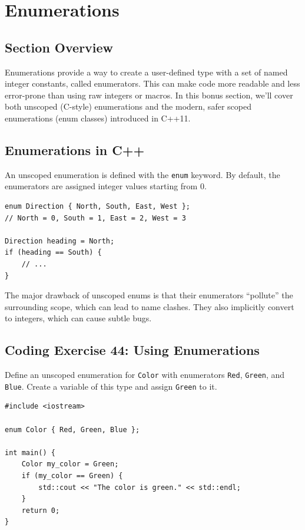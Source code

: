 \section{Enumerations}

\subsection{Section Overview}
Enumerations provide a way to create a user-defined type with a set of named integer constants, called enumerators. This can make code more readable and less error-prone than using raw integers or macros. In this bonus section, we'll cover both unscoped (C-style) enumerations and the modern, safer scoped enumerations (enum classes) introduced in C++11.

\subsection{Enumerations in C++}
An unscoped enumeration is defined with the \texttt{enum} keyword. By default, the enumerators are assigned integer values starting from 0.
\begin{lstlisting}
enum Direction { North, South, East, West };
// North = 0, South = 1, East = 2, West = 3

Direction heading = North;
if (heading == South) {
	// ...
}
\end{lstlisting}
The major drawback of unscoped enums is that their enumerators ``pollute'' the surrounding scope, which can lead to name clashes. They also implicitly convert to integers, which can cause subtle bugs.

\subsection{Coding Exercise 44: Using Enumerations}
Define an unscoped enumeration for \texttt{Color} with enumerators \texttt{Red}, \texttt{Green}, and \texttt{Blue}. Create a variable of this type and assign \texttt{Green} to it.
\begin{lstlisting}
#include <iostream>

enum Color { Red, Green, Blue };

int main() {
	Color my_color = Green;
	if (my_color == Green) {
		std::cout << "The color is green." << std::endl;
	}
	return 0;
}
\end{lstlisting}

